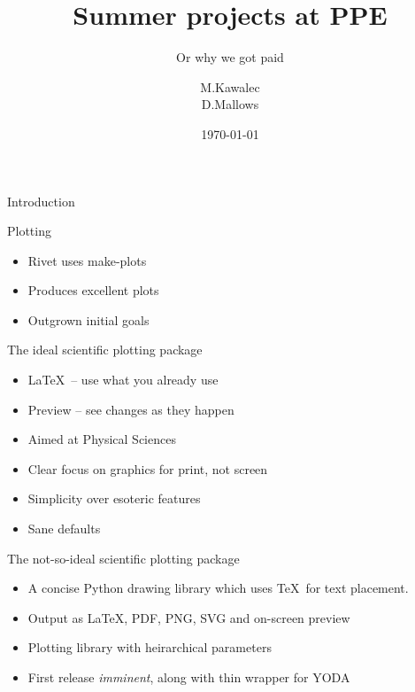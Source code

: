 \documentclass{beamer}
\title{Summer projects at PPE}
\subtitle{Or why we got paid}
\author{M.Kawalec \\ D.Mallows}
\date{\today}
\begin{document}
  \frame{\titlepage}


  \begin{frame}{Introduction}


  \end{frame}

  \begin{frame}{Plotting}
    \begin{itemize}[<uncover@+>]
      \item Rivet uses make-plots
      \item Produces excellent plots
      \item Outgrown initial goals
    \end{itemize}
  \end{frame}

  \begin{frame}{The ideal scientific plotting package}
    \begin{itemize}[<uncover@+>]
      \item \LaTeX\ -- use what you already use
      \item Preview -- see changes as they happen
      \item Aimed at Physical Sciences
      \item Clear focus on graphics for print, not screen
      \item Simplicity over esoteric features
      \item Sane defaults
    \end{itemize}
  \end{frame}

  \begin{frame}{The not-so-ideal scientific plotting package}
    \begin{itemize}[<uncover@+>]
      \item A concise Python drawing library which uses \TeX\ for text placement.
      \item Output as \LaTeX, PDF, PNG, SVG and on-screen preview
      \item Plotting library with heirarchical parameters
      \item First release {\em imminent}, along with thin wrapper for YODA
    \end{itemize}
  \end{frame}
\end{document}
